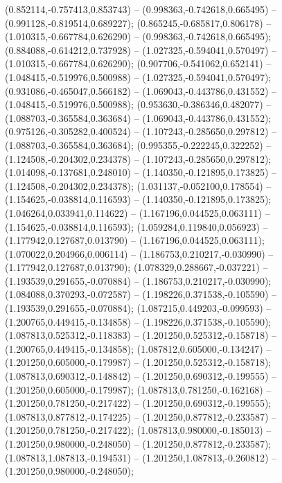  (0.852114,-0.757413,0.853743) -- (0.998363,-0.742618,0.665495) -- (0.991128,-0.819514,0.689227);
 (0.865245,-0.685817,0.806178) -- (1.010315,-0.667784,0.626290) -- (0.998363,-0.742618,0.665495);
 (0.884088,-0.614212,0.737928) -- (1.027325,-0.594041,0.570497) -- (1.010315,-0.667784,0.626290);
 (0.907706,-0.541062,0.652141) -- (1.048415,-0.519976,0.500988) -- (1.027325,-0.594041,0.570497);
 (0.931086,-0.465047,0.566182) -- (1.069043,-0.443786,0.431552) -- (1.048415,-0.519976,0.500988);
 (0.953630,-0.386346,0.482077) -- (1.088703,-0.365584,0.363684) -- (1.069043,-0.443786,0.431552);
 (0.975126,-0.305282,0.400524) -- (1.107243,-0.285650,0.297812) -- (1.088703,-0.365584,0.363684);
 (0.995355,-0.222245,0.322252) -- (1.124508,-0.204302,0.234378) -- (1.107243,-0.285650,0.297812);
 (1.014098,-0.137681,0.248010) -- (1.140350,-0.121895,0.173825) -- (1.124508,-0.204302,0.234378);
 (1.031137,-0.052100,0.178554) -- (1.154625,-0.038814,0.116593) -- (1.140350,-0.121895,0.173825);
 (1.046264,0.033941,0.114622) -- (1.167196,0.044525,0.063111) -- (1.154625,-0.038814,0.116593);
 (1.059284,0.119840,0.056923) -- (1.177942,0.127687,0.013790) -- (1.167196,0.044525,0.063111);
 (1.070022,0.204966,0.006114) -- (1.186753,0.210217,-0.030990) -- (1.177942,0.127687,0.013790);
 (1.078329,0.288667,-0.037221) -- (1.193539,0.291655,-0.070884) -- (1.186753,0.210217,-0.030990);
 (1.084088,0.370293,-0.072587) -- (1.198226,0.371538,-0.105590) -- (1.193539,0.291655,-0.070884);
 (1.087215,0.449203,-0.099593) -- (1.200765,0.449415,-0.134858) -- (1.198226,0.371538,-0.105590);
 (1.087813,0.525312,-0.118383) -- (1.201250,0.525312,-0.158718) -- (1.200765,0.449415,-0.134858);
 (1.087812,0.605000,-0.134247) -- (1.201250,0.605000,-0.179987) -- (1.201250,0.525312,-0.158718);
 (1.087813,0.690312,-0.148842) -- (1.201250,0.690312,-0.199555) -- (1.201250,0.605000,-0.179987);
 (1.087813,0.781250,-0.162168) -- (1.201250,0.781250,-0.217422) -- (1.201250,0.690312,-0.199555);
 (1.087813,0.877812,-0.174225) -- (1.201250,0.877812,-0.233587) -- (1.201250,0.781250,-0.217422);
 (1.087813,0.980000,-0.185013) -- (1.201250,0.980000,-0.248050) -- (1.201250,0.877812,-0.233587);
 (1.087813,1.087813,-0.194531) -- (1.201250,1.087813,-0.260812) -- (1.201250,0.980000,-0.248050);
